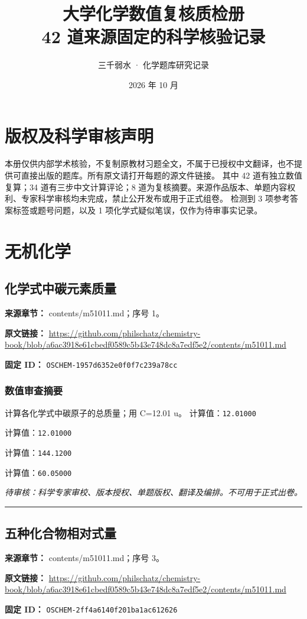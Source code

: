 \documentclass[UTF8,11pt,oneside,openany,fontset=none]{ctexbook}
\title{大学化学数值复核质检册\\[0.4em]\large 42 道来源固定的科学核验记录}
\author{三千弱水 · 化学题库研究记录}
\date{2026 年 10 月}
\begin{document}
\frontmatter
\maketitle
\chapter*{版权及科学审核声明}
本册仅供内部学术核验，不复制原教材习题全文，不属于已授权中文翻译，也不提供可直接出版的题库。所有原文请打开每题的源文件链接。
其中 42 道有独立数值复算；34 道有三步中文计算评论；8 道为复核摘要。来源作品版本、单题内容权利、专家科学审核均未完成，禁止公开发布或用于正式组卷。
检测到 3 项参考答案标签或题号问题，以及 1 项化学式疑似笔误，仅作为待审事实记录。
\tableofcontents
\mainmatter
\chapter{无机化学}
\section{化学式中碳元素质量}
\noindent\textbf{来源章节：} contents/m51011.md；序号 1。\par
\noindent\textbf{原文链接：} \url{https://github.com/philschatz/chemistry-book/blob/a6ac3918e61cbedf0589c5b43e748dc8a7edf5e2/contents/m51011.md}\par
\noindent\textbf{固定 ID：} \texttt{OSCHEM-1957d6352e0f0f7c239a78cc}\par
\subsection*{数值审查摘要}
计算各化学式中碳原子的总质量；用 C=12.01 u。
\noindent 计算值：\texttt{12.01000}\par
\noindent 计算值：\texttt{12.01000}\par
\noindent 计算值：\texttt{144.1200}\par
\noindent 计算值：\texttt{60.05000}\par
\noindent\textit{待审核：科学专家审校、版本授权、单题版权、翻译及编排。不可用于正式出卷。}
\medskip\hrule\medskip
\section{五种化合物相对式量}
\noindent\textbf{来源章节：} contents/m51011.md；序号 3。\par
\noindent\textbf{原文链接：} \url{https://github.com/philschatz/chemistry-book/blob/a6ac3918e61cbedf0589c5b43e748dc8a7edf5e2/contents/m51011.md}\par
\noindent\textbf{固定 ID：} \texttt{OSCHEM-2ff4a6140f201ba1ac612626}\par
\end{document}
